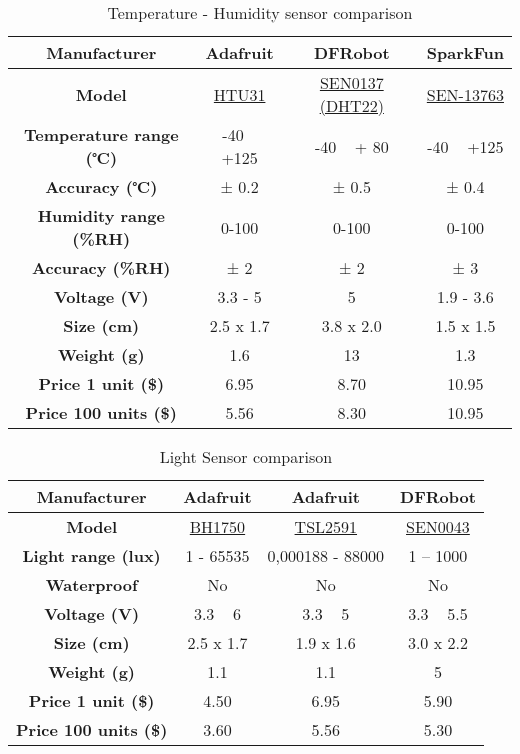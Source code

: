 \begin{table}[!h]
    \centering
    \scriptsize
    \begin{tabular}{c c c c}
        \hline
        \textbf{Manufacturer} & Adafruit & DFRobot & SparkFun\\
        \hline
        \textbf{Model} & \href{https://www.adafruit.com/product/4832}{HTU31} & \href{https://www.dfrobot.com/product-1102.html}{SEN0137 (DHT22)} & \href{https://www.sparkfun.com/products/13763#reviews}{SEN-13763}\\
        \textbf{Temperature range (℃)} & -40 ~ +125 & -40 ~ + 80 & -40 ~ +125\\
        \textbf{Accuracy (℃)} & ± 0.2 & ± 0.5 & ± 0.4\\
        \textbf{Humidity range (\%RH)} & 0-100 & 0-100 & 0-100\\
        \textbf{Accuracy (\%RH)} & ± 2 & ± 2 & ± 3\\
        \textbf{Voltage (V)} & 3.3 - 5 & 5 & 1.9 - 3.6\\
        \textbf{Size (cm)} & 2.5 x 1.7 & 3.8 x 2.0 & 1.5 x 1.5\\
        \textbf{Weight (g)} & 1.6 & 13 & 1.3\\
        \textbf{Price 1 unit (\$)} & 6.95 & 8.70 & 10.95\\
        \textbf{Price 100 units (\$)} & 5.56 & 8.30 & 10.95\\
        \hline
        \end{tabular}
    \caption{Temperature - Humidity sensor comparison}
    \label{tab:temp_hum_sensor_comparison}
\end{table}

\begin{table}[!h]
    \centering
    \begin{tabular}{c c c c}
        \hline
        \textbf{Manufacturer} & Adafruit & Adafruit & DFRobot\\
        \hline
        \textbf{Model} & \href{https://www.adafruit.com/product/4681}{BH1750} & \href{https://learn.adafruit.com/tsl2561}{TSL2591} & \href{https://www.dfrobot.com/product-274.html}{SEN0043}\\
        \textbf{Light range (lux)} & 1 - 65535 & 0,000188 - 88000 & 1 – 1000\\
        \textbf{Waterproof} & No & No & No\\
        \textbf{Voltage (V)} & 3.3 ~ 6 & 3.3 ~ 5 & 3.3 ~ 5.5\\
        \textbf{Size (cm)} & 2.5 x 1.7 & 1.9 x 1.6 & 3.0 x 2.2\\
        \textbf{Weight (g)} & 1.1 & 1.1 & 5\\
        \textbf{Price 1 unit (\$)} & 4.50 & 6.95 & 5.90\\
        \textbf{Price 100 units (\$)} & 3.60 & 5.56 & 5.30\\
        \hline
        \end{tabular}
    \caption{Light Sensor comparison}
    \label{tab:light_sensor_comparison}
\end{table}

